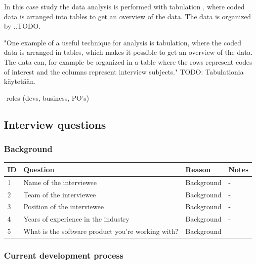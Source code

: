 \documentclass[english]{tktltiki2}
\theoremstyle{definition}
\theoremstyle{remark}
\begin{document}
In this case study the data analysis is performed with tabulation \cite{runeson2009guidelines}, where coded data is arranged into tables to get an overview of the data. The data is organized by ..TODO.

"One example of a useful technique for analysis is tabulation, where the coded data is arranged in tables, which makes it possible to get an overview of the data. The data can, for example be organized in a table where the rows represent codes of interest and the columns represent interview subjects." \cite{runeson2009guidelines} TODO: Tabulationia käytetään.

 -roles (devs, business, PO's)


\subsection{Interview questions}

\subsubsection{Background}

\begin{center}
    \begin{tabular}{ | l | l | l | p{5cm} |} %
    \hline
    ID & Question & Reason & Notes \\ \hline
    1 & Name of the interviewee & Background & - \\ \hline
    2 & Team of the interviewee & Background & - \\ \hline
    3 & Position of the interviewee & Background & - \\ \hline
    4 & Years of experience in the industry & Background & - \\ \hline
    5 & What is the software product you're working with? & Background &  \\ \hline
    \hline
    \end{tabular}
\end{center}

\subsubsection{Current development process}
\end{document}
